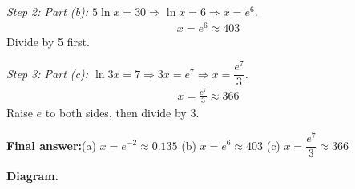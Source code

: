 \documentclass[11pt]{article}
\begin{document}
\textit{Step 2: Part (b): \( 5\ln x = 30 \Rightarrow \ln x = 6 \Rightarrow x = e^6 \).}
\[\begin{gathered}
x = e^6 \approx 403
\end{gathered}\]
Divide by 5 first.

\textit{Step 3: Part (c): \( \ln 3x = 7 \Rightarrow 3x = e^7 \Rightarrow x = \dfrac{e^7}{3} \).}
\[\begin{gathered}
x = \frac{e^7}{3} \approx 366
\end{gathered}\]
Raise \( e \) to both sides, then divide by 3.

\begin{answerbox}
\textbf{Final answer:}\quad (a) \(\displaystyle  x = e^{-2} \approx 0.135 \) \quad  (b) \(\displaystyle  x = e^6 \approx 403 \) \quad  (c) \(\displaystyle  x = \dfrac{e^7}{3} \approx 366 \)
\end{answerbox}
\textbf{Diagram.}
\end{document}
